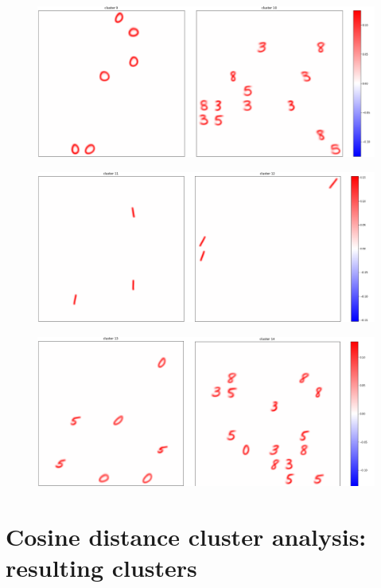 \documentclass[a4paper]{report}
\begin{document}
\begin{figure} [H]
    \centering
    \includegraphics [width=\textwidth ] {c/e/9.png}
    \caption{}
\end{figure}

\begin{figure} [H]
    \centering
    \includegraphics [width=\textwidth ] {c/e/11.png}
    \caption{}
\end{figure}

\begin{figure} [H]
    \centering
    \includegraphics [width=\textwidth ] {c/e/13.png}
    \caption{}
\end{figure}

\chapter{Cosine distance cluster analysis: resulting clusters}
\end{document}

